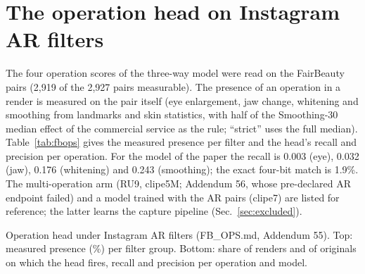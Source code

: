 \documentclass[10pt]{article}
\begin{document}
\section{The operation head on Instagram AR filters}
\label{sec:fbops}
The four operation scores of the three-way model were read on the FairBeauty pairs (2,919 of the 2,927 pairs measurable). The presence of an
operation in a render is measured on the pair itself (eye enlargement, jaw change, whitening and smoothing from landmarks and
skin statistics, with half of the Smoothing-30 median effect of the commercial service as the rule; ``strict'' uses the full
median). Table~\ref{tab:fbops} gives the measured presence per filter and the head's recall and precision per operation. For
the model of the paper the recall is 0.003 (eye), 0.032 (jaw), 0.176 (whitening) and 0.243 (smoothing); the exact four-bit
match is 1.9\%. The multi-operation arm (RU9, clipe5M; Addendum 56, whose pre-declared AR endpoint failed) and a model trained with the AR pairs (clipe7) are listed for
reference; the latter learns the capture pipeline (Sec.~\ref{sec:excluded}).
\begin{table}[H]
\centering
\caption{Operation head under Instagram AR filters (FB\_OPS.md, Addendum 55). Top: measured presence (\%) per filter group.
Bottom: share of renders and of originals on which the head fires, recall and precision per operation and model.}
\label{tab:fbops}
\scriptsize
\begin{adjustbox}{max width=\linewidth}\end{adjustbox}\\[4pt]
\begin{adjustbox}{max width=\linewidth}\end{adjustbox}
\end{table}
\end{document}
